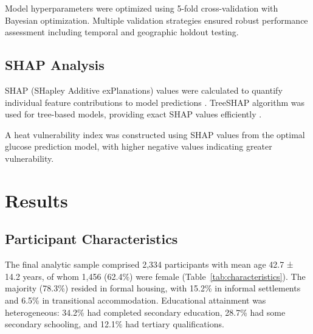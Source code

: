 \documentclass[11pt,a4paper]{article}
\begin{document}
Model hyperparameters were optimized using 5-fold cross-validation with Bayesian optimization. Multiple validation strategies ensured robust performance assessment including temporal and geographic holdout testing.

\subsection{SHAP Analysis}

SHAP (SHapley Additive exPlanations) values were calculated to quantify individual feature contributions to model predictions \citep{lundberg2017unified}. TreeSHAP algorithm was used for tree-based models, providing exact SHAP values efficiently \citep{lundberg2020local}.

A heat vulnerability index was constructed using SHAP values from the optimal glucose prediction model, with higher negative values indicating greater vulnerability.

\section{Results}

\subsection{Participant Characteristics}

The final analytic sample comprised 2,334 participants with mean age 42.7 ± 14.2 years, of whom 1,456 (62.4\%) were female (Table~\ref{tab:characteristics}). The majority (78.3\%) resided in formal housing, with 15.2\% in informal settlements and 6.5\% in transitional accommodation. Educational attainment was heterogeneous: 34.2\% had completed secondary education, 28.7\% had some secondary schooling, and 12.1\% had tertiary qualifications.
\end{document}
